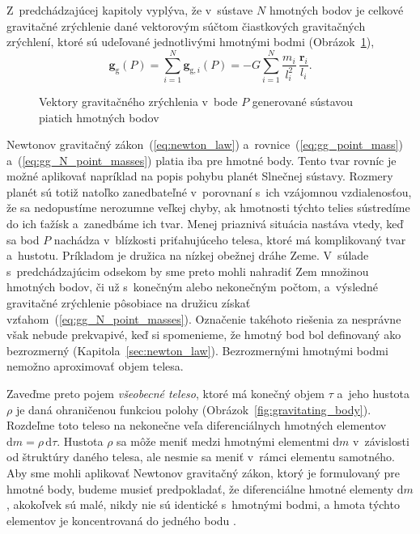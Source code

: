 \documentclass[a4paper,12pt]{book}
\newcommand{\diff}{\mathrm d}
\newcommand{\gidx}{\mathrm g}
\let\vec\mathbf
\begin{document}
Z~predchádzajúcej kapitoly vyplýva, že v~sústave $N$ hmotných bodov je celkové 
gravitačné zrýchlenie dané vektorovým súčtom čiastkových
gravitačných zrýchlení, ktoré sú udeľované jednotlivými hmotnými bodmi
(Obrázok~\ref{fig:gg_n_point_masses}),
%
\begin{equation}
\label{eq:gg_N_point_masses}
\vec g_\gidx(P) = \sum_{i = 1}^{N}\vec g_{\gidx,i}(P) = -G \sum_{i = 1}^{N}
\frac{m_i}{l_i^2} \, \frac{\vec r_i}{l_i}{.}
\end{equation}

\begin{figure}[b]
\centering

\caption{Vektory gravitačného zrýchlenia v~bode $P$ generované sústavou piatich
hmotných bodov}
\label{fig:gg_n_point_masses}
\end{figure}

Newtonov gravitačný zákon~(\ref{eq:newton_law}) 
a~rovnice~(\ref{eq:gg_point_mass}) a~(\ref{eq:gg_N_point_masses}) platia iba 
pre hmotné body.  Tento tvar rovníc je možné aplikovať napríklad na popis 
pohybu planét Slnečnej sústavy.  Rozmery planét sú totiž natoľko zanedbateľné 
v~porovnaní s~ich vzájomnou vzdialenosťou, že sa nedopustíme nerozumne veľkej 
chyby, ak hmotnosti týchto telies sústredíme do ich ťažísk a~zanedbáme ich 
tvar.  Menej priaznivá situácia nastáva vtedy, keď sa bod $P$ nachádza 
v~blízkosti priťahujúceho telesa, ktoré má komplikovaný tvar a~hustotu.  
Príkladom je družica na nízkej obežnej dráhe Zeme.  V~súlade s~predchádzajúcim 
odsekom by sme preto mohli nahradiť Zem množinou hmotných bodov, či už 
s~konečným alebo nekonečným počtom, a~výsledné gravitačné zrýchlenie pôsobiace 
na družicu získať vzťahom~(\ref{eq:gg_N_point_masses}).  Označenie takéhoto 
riešenia za nesprávne však nebude prekvapivé, keď si spomenieme, že hmotný bod 
bol definovaný ako bezrozmerný (Kapitola~\ref{sec:newton_law}).  Bezrozmernými 
hmotnými bodmi nemožno aproximovať objem telesa.

Zaveďme preto pojem \emph{všeobecné teleso}, ktoré má konečný objem $\tau$ 
a~jeho hustota $\rho$ je daná ohraničenou funkciou polohy 
(Obrázok~\ref{fig:gravitating_body}).  Rozdeľme toto teleso na nekonečne veľa 
diferenciálnych hmotných elementov $\diff m = \rho \, \diff \tau$.  Hustota 
$\rho$ sa môže meniť medzi hmotnými elementmi $\diff m$ v~závislosti od 
štruktúry daného telesa, ale nesmie sa meniť v~rámci elementu samotného.  Aby 
sme mohli aplikovať Newtonov gravitačný zákon, ktorý je formulovaný pre hmotné 
body, budeme musieť predpokladať, že diferenciálne hmotné elementy $\diff m$, 
akokoľvek sú malé, nikdy nie sú identické s~hmotnými bodmi, a hmota týchto 
elementov je koncentrovaná do jedného bodu \parencite{Kellogg1967}.
\end{document}
